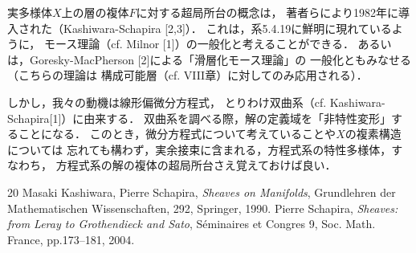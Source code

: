 \documentclass[uplatex,dvipdfmx,b5paper,9pt,draft]{jsreport}
\theoremstyle{definition}
\numberwithin{equation}{section}
\theoremstyle{mystyle}
\begin{document}
実多様体\(X\)上の層の複体\(F\)に対する超局所台の概念は，
著者らにより1982年に導入された（Kashiwara-Schapira [2,3]）．
これは，系5.4.19に鮮明に現れているように，
モース理論（cf. Milnor [1]）の一般化と考えることができる．
あるいは，Goresky-MacPherson [2]による「滑層化モース理論」の
一般化ともみなせる（こちらの理論は
構成可能層（cf. VIII章）に対してのみ応用される）．

しかし，我々の動機は線形偏微分方程式，
とりわけ双曲系（cf. Kashiwara-Schapira[1]）に由来する．
双曲系を調べる際，解の定義域を「非特性変形」することになる．
このとき，微分方程式について考えていることや\(X\)の複素構造については
忘れても構わず，実余接束に含まれる，方程式系の特性多様体，すなわち，
方程式系の解の複体の超局所台さえ覚えておけば良い．

\begin{thebibliography}{20} 
     Masaki Kashiwara, Pierre Schapira, 
      \textit{Sheaves on Manifolds}, 
      Grundlehren der Mathematischen Wissenschaften, 292, Springer, 1990.
     Pierre Schapira, 
      \textit{Sheaves: from Leray to Grothendieck and Sato}, 
      S\'eminaires et Congres 9, Soc. Math. France, pp.173--181, 2004.
\end{thebibliography}
  
\end{document}
